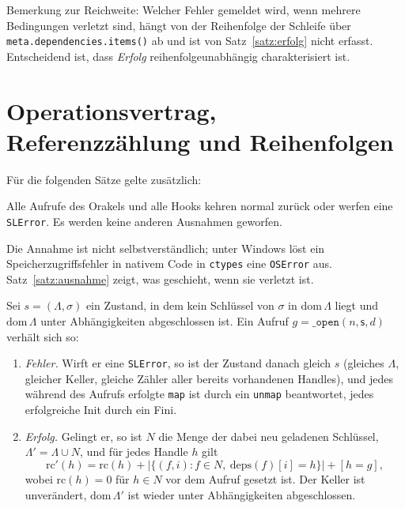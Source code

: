 Bemerkung zur Reichweite: Welcher Fehler gemeldet wird, wenn mehrere Bedingungen verletzt sind, hängt von der Reihenfolge der Schleife über \texttt{meta.dependencies.items()} ab und ist von Satz~\ref{satz:erfolg} nicht erfasst. Entscheidend ist, dass \emph{Erfolg} reihenfolgeunabhängig charakterisiert ist.

\section{Operationsvertrag, Referenzzählung und Reihenfolgen}

Für die folgenden Sätze gelte zusätzlich:

\begin{annahme}[Ausnahmeklasse]
	\label{ann:exc}
	Alle Aufrufe des Orakels und alle Hooks kehren normal zurück oder werfen eine \texttt{SLError}. Es werden keine anderen Ausnahmen geworfen.
\end{annahme}

Die Annahme ist nicht selbstverständlich; unter Windows löst ein Speicherzugriffsfehler in nativem Code in \texttt{ctypes} eine \texttt{OSError} aus. Satz~\ref{satz:ausnahme} zeigt, was geschieht, wenn sie verletzt ist.

\begin{lemma}[Operationsvertrag]
	\label{lem:vertrag}
	Sei $s=(\Lambda,\sigma)$ ein Zustand, in dem kein Schlüssel von $\sigma$ in $\mathrm{dom}\,\Lambda$ liegt und $\mathrm{dom}\,\Lambda$ unter Abhängigkeiten abgeschlossen ist. Ein Aufruf $g=\texttt{\_open}(n,\mathsf{s},d)$ verhält sich so:
	\begin{enumerate}[label=(\alph*)]
		\item \emph{Fehler.} Wirft er eine \texttt{SLError}, so ist der Zustand danach gleich $s$ (gleiches $\Lambda$, gleicher Keller, gleiche Zähler aller bereits vorhandenen Handles), und jedes während des Aufrufs erfolgte \texttt{map} ist durch ein \texttt{unmap} beantwortet, jedes erfolgreiche Init durch ein Fini.
		\item \emph{Erfolg.} Gelingt er, so ist $N$ die Menge der dabei neu geladenen Schlüssel, $\Lambda'=\Lambda\cup N$, und für jedes Handle $h$ gilt
		\[
		\mathrm{rc}'(h)=\mathrm{rc}(h)+\bigl|\{(f,i): f\in N,\ \mathrm{deps}(f)[i]=h\}\bigr|+[h=g],
		\]
		wobei $\mathrm{rc}(h)=0$ für $h\in N$ vor dem Aufruf gesetzt ist. Der Keller ist unverändert, $\mathrm{dom}\,\Lambda'$ ist wieder unter Abhängigkeiten abgeschlossen.
	\end{enumerate}
\end{lemma}

